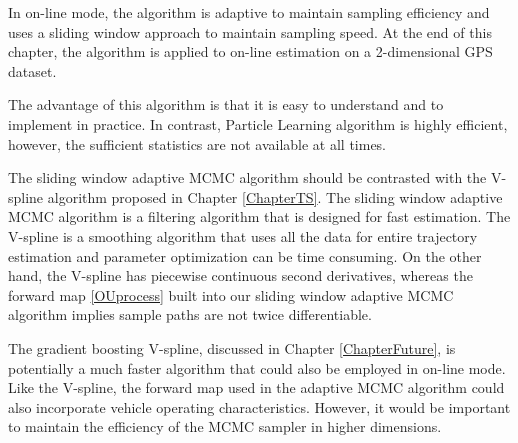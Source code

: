 In on-line mode, the algorithm is adaptive to maintain sampling efficiency and uses a sliding window approach to maintain sampling speed. At the end of this chapter, the algorithm is applied to on-line estimation on a 2-dimensional GPS dataset. 


The advantage of this algorithm is that it is easy to understand and to implement in practice. In contrast, Particle Learning algorithm is highly efficient, however, the sufficient statistics are not available at all times. 

The sliding window adaptive MCMC algorithm should be contrasted with the V-spline algorithm proposed in Chapter \ref{ChapterTS}. The sliding window adaptive MCMC algorithm is a filtering algorithm that is designed for fast estimation. The V-spline is a smoothing algorithm that uses all the data for entire trajectory estimation and parameter optimization can be time consuming. On the other hand, the V-spline has piecewise continuous second derivatives, whereas the forward map \eqref{OUprocess} built into our sliding window adaptive MCMC algorithm implies sample paths are not twice differentiable.

The gradient boosting V-spline, discussed in Chapter \ref{ChapterFuture}, is potentially a much faster algorithm that could also be employed in on-line mode. Like the V-spline, the forward map used in the adaptive MCMC algorithm could also incorporate vehicle operating characteristics. However, it would be important to maintain the efficiency of the MCMC sampler in higher dimensions. 

